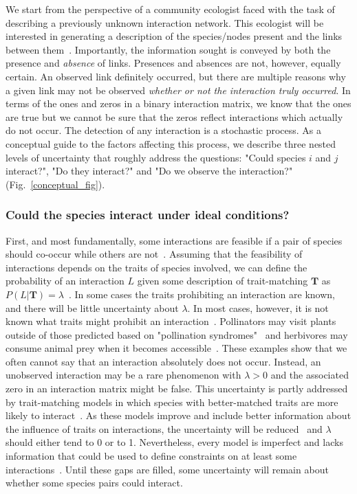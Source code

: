 \documentclass[12pt]{article}
\begin{document}
\begin{spacing}{2.0}
      We start from the perspective of a community ecologist faced with the task of describing a previously unknown interaction network. This ecologist will be interested in generating a description of the species/nodes present and the links between them~\citep{Roslin2016}.  Importantly, the information sought is conveyed by both the presence and \emph{absence} of links. Presences and absences are not, however, equally certain. An observed link definitely occurred, but there are multiple reasons why a given link may not be observed \emph{whether or not the interaction truly occurred}. In terms of the ones and zeros in a binary interaction matrix, we know that the ones are true but we cannot be sure that the zeros reflect interactions which actually do not occur. The detection of any interaction is a stochastic process. As a conceptual guide to the factors affecting this process, we describe three nested levels of uncertainty that roughly address the questions: "Could species $i$ and $j$ interact?", "Do they interact?" and "Do we observe the interaction?" (Fig.~\ref{conceptual_fig}).


        \subsubsection*{Could the species interact under ideal conditions?} 

          First, and most fundamentally, some interactions are feasible if a pair of species should co-occur while others are not~\citep{Poisot2015}. Assuming that the feasibility of interactions depends on the traits of species involved, we can define the probability of an interaction $L$ given some description of trait-matching $\mathbf{T}$ as $P(L|\mathbf{T}) = \lambda$~\citep{Gravel2013,others}. 
          In some cases the traits prohibiting an interaction are known, and there will be little uncertainty about $\lambda$.
          In most cases, however, it is not known what traits might prohibit an interaction~\citep{Dormann2017}. Pollinators may visit plants outside of those predicted based on "pollination syndromes"~\citep{Weinstein2017a} and herbivores may consume animal prey when it becomes accessible~\citep{}. These examples show that we often cannot say that an interaction absolutely does not occur. Instead, an unobserved interaction may be a rare phenomenon with $\lambda>0$ and the associated zero in an interaction matrix might be false. This uncertainty is partly addressed by trait-matching models in which species with better-matched traits are more likely to interact~\citep{Bartomeus2016,Jordano2016}. As these models improve and include better information about the influence of traits on interactions, the uncertainty will be reduced~\citep{Jordano2016} and $\lambda$ should either tend to 0 or to 1. Nevertheless, every model is imperfect and lacks information that could be used to define constraints on at least some interactions~\citep{Dormann2017}. Until these gaps are filled, some uncertainty will remain about whether some species pairs could interact.



\end{spacing}
\end{document}
